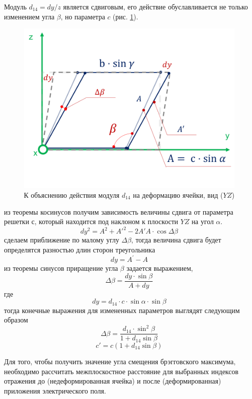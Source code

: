 Модуль $d_{14} = dy/z$ является сдвиговым, его действие обуславливается не только
изменением угла $\beta$, но параметра $c$ (рис. \ref{ris:d14}).
\begin{figure}[H]
  \centering
  \includegraphics[width=.6\textwidth]{images/d14.png}
  \caption{К объяснению действия модуля $d_{14}$ на деформацию ячейки, вид ($YZ$)}
  \label{ris:d14}
\end{figure}
из теоремы косинусов получим зависимость величины сдвига от параметра решетки $с$,
который находится под наклоном к плоскости $YZ$ на угол $\alpha$.
$$
    dy^2 = A^2 + A{'}^2 - 2 A{'}A \cdot \cos \Delta \beta
$$
сделаем приближение по малому углу $\Delta \beta$, тогда величина сдвига будет
определятся разностью длин сторон треугольника
$$
  dy = A^{'} - A
$$
из теоремы синусов приращение угла $\beta$ задается выражением,
$$
\Delta \beta = \frac{dy \cdot\sin \beta}{ A+dy }
$$
\noindent
где
$$
dy = d_{14} \cdot c \cdot \sin \alpha \cdot \sin \beta
$$
тогда конечные выражения для измененных параметров выглядят следующим образом
\begin{equation}
   \Delta \beta = \frac{d_{14} \cdot \sin^2\beta}{1+d_{14}\sin \beta}
   \label{eq:b_formed_5}
\end{equation}
\begin{equation}
   c{'} = c(1+d_{14}\sin\beta)
   \label{eq:b_formed_6}
\end{equation}

Для того, чтобы получить значение угла смещения брэгговского максимума,
необходимо рассчитать межплоскостное расстояние для выбранных индексов отражения
до (недеформированная ячейка) и после (деформированная) приложения электрического
поля.
